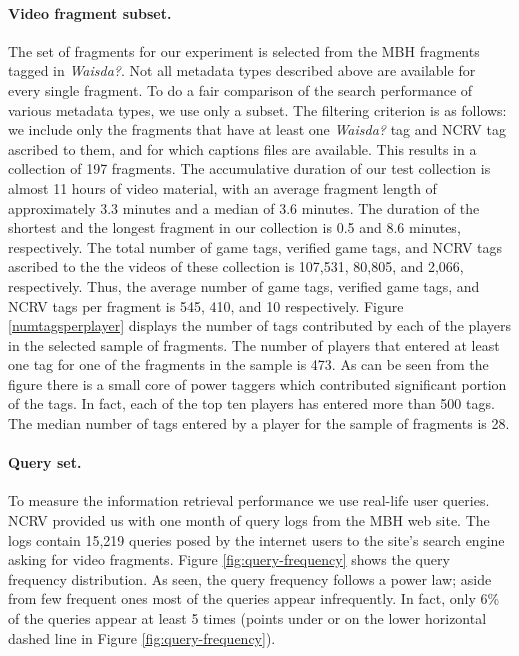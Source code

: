 \paragraph{\textbf{Video fragment subset.}}
\label{sec:fragment-collection}
The set of fragments for our experiment is selected from the MBH fragments tagged in \textit{Waisda?}. Not all metadata types described above are available for every single fragment. To do a fair comparison of the search performance of various metadata types, we use only a subset. The filtering criterion is as follows: we include only the fragments that have at least one \textit{Waisda?} tag and NCRV tag ascribed to them, and for which captions files are available. This results in a collection of 197 fragments. The accumulative duration of our test collection is almost 11 hours of video material, with an average fragment length of approximately 3.3 minutes and a median of 3.6 minutes. The duration of the shortest and the longest fragment in our collection is 0.5 and 8.6 minutes, respectively. The total number of game tags, verified game tags, and NCRV tags ascribed to the the videos of these collection is 107,531, 80,805, and 2,066, respectively. Thus, the average number of game tags, verified game tags, and NCRV tags per fragment is 545, 410, and 10 respectively. Figure \ref{numtagsperplayer} displays the number of tags contributed by each of the players in the selected sample of fragments. The number of players that entered at least one tag for one of the fragments in the sample is 473. As can be seen from the figure there is a small core of power taggers which contributed significant portion of the tags. In fact, each of the top ten players has entered more than 500 tags. The median number of tags entered by a player for the sample of fragments is 28.

\paragraph{\textbf{Query set.}}\label{ecir-sec:query-set}
To measure the information retrieval performance we use real-life user queries. NCRV provided us with one month of query logs from the MBH web site. The logs contain 15,219 queries posed by the internet users to the site's search engine asking for video fragments. Figure \ref{fig:query-frequency} shows the query frequency distribution. As seen, the query frequency follows a power law; aside from few frequent ones most of the queries appear infrequently. In fact, only 6\% of the queries appear at least 5 times (points under or on the lower horizontal dashed line in Figure \ref{fig:query-frequency}).

